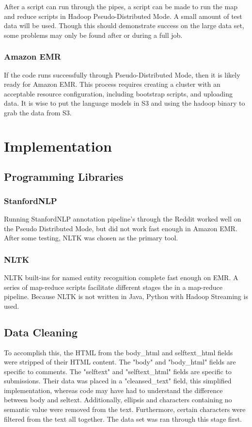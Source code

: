 \documentclass[12pt,a4paper]{article}
\begin{document}
After a script can run through the pipes, a script can be made to run
the map and reduce scripts in Hadoop Pseudo-Distributed Mode. A small
amount of test data will be used. Though this should demonstrate
success on the large data set, some problems may only be found
after or during a full job.

\subsubsection{Amazon EMR}

If the code runs successfully through Pseudo-Distributed Mode, then it
is likely ready for Amazon EMR. This process requires creating a cluster
with an acceptable resource configuration, including bootstrap scripts,
and uploading data. It is wise to put the language models in S3 and using
the hadoop binary to grab the data from S3.

\section{Implementation}

\subsection{Programming Libraries}

\subsubsection{StanfordNLP}

Running StanfordNLP annotation pipeline's through the Reddit worked well
on the Pseudo Distributed Mode, but did not work fast enough in 
Amazon EMR. After some testing, NLTK was chosen as the primary tool.

\subsubsection{NLTK}

NLTK built-ins for named entity recognition complete fast enough on EMR.
A series of map-reduce scripts facilitate different stages the in 
a map-reduce pipeline. Because NLTK is not written in Java, Python
with Hadoop Streaming is used.

\subsection{Data Cleaning}
To accomplish this, the HTML from the body\_html and selftext\_html fields
were stripped of their HTML content. The "body" and "body\_html" fields
are specific to comments. The "selftext" and "selftext\_html" fields are
specific to submissions. Their data was placed in a 
"cleansed\_text" field, this simplified implementation, whereas code
may have had to understand the difference between body and seltext. Additionally, ellipsis and
characters containing no semantic value were removed from the text.
Furthermore, certain characters were filtered from the text all together. 
The data set was ran through this stage first.
\end{document}
